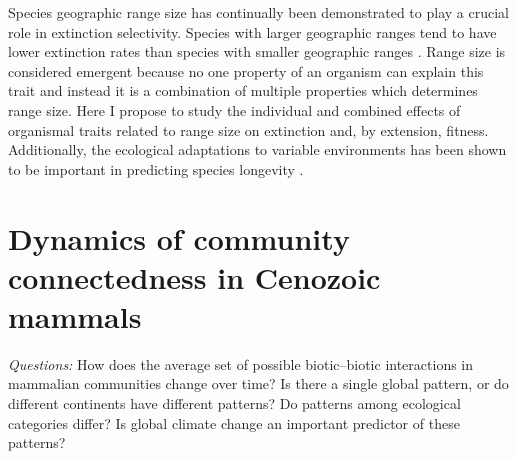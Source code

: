 \documentclass[12pt,letterpaper]{article}
\begin{document}


Species geographic range size has continually been demonstrated to play a crucial role in extinction selectivity. Species with larger geographic ranges tend to have lower extinction rates than species with smaller geographic ranges \citep{Jablonski1986,Harnik2013,Nurnberg2013a,Jablonski2003,Roy2009c}. Range size is considered emergent because no one property of an organism can explain this trait and instead it is a combination of multiple properties which determines range size. Here I propose to study the individual and combined effects of organismal traits related to range size on extinction and, by extension, fitness. Additionally, the ecological adaptations to variable environments has been shown to be important in predicting species longevity \citep{Foote2013,Liow2007b}.


\section{Dynamics of community connectedness in Cenozoic mammals}

\textit{Questions:} 
How does the average set of possible biotic--biotic interactions in mammalian communities change over time? Is there a single global pattern, or do different continents have different patterns? Do patterns among ecological categories differ? Is global climate change an important predictor of these patterns?
\end{document}
